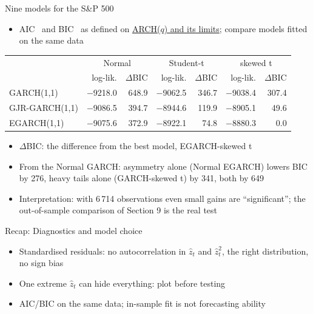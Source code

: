 \begin{frame}{Nine models for the S\&P 500}
\itemsize{\footnotesize}
\begin{itemize}
    \item AIC \ and BIC \ as defined on \hyperlink{ch5-aicbic}{ARCH($q$) and its limits}; compare models fitted on the same data
\end{itemize}\begin{center}
\scriptsize
\begin{tabular}{lrrrrrr}
\toprule
& \multicolumn{2}{c}{Normal} & \multicolumn{2}{c}{Student-t} & \multicolumn{2}{c}{skewed t} \\ & log-lik. & $\Delta$BIC & log-lik. & $\Delta$BIC & log-lik. & $\Delta$BIC \\
\midrule
GARCH(1,1) & \ensuremath{-}9218.0 & 648.9 & \ensuremath{-}9062.5 & 346.7 & \ensuremath{-}9038.4 & 307.4 \\
GJR-GARCH(1,1) & \ensuremath{-}9086.5 & 394.7 & \ensuremath{-}8944.6 & 119.9 & \ensuremath{-}8905.1 & 49.6 \\
EGARCH(1,1) & \ensuremath{-}9075.6 & 372.9 & \ensuremath{-}8922.1 & 74.8 & \ensuremath{-}8880.3 & 0.0 \\
\bottomrule
\end{tabular}
\end{center}
\begin{itemize}
    \item $\Delta$BIC: the difference from the best model, EGARCH-skewed t
    \item From the Normal GARCH: asymmetry alone (Normal EGARCH) lowers BIC by 276, heavy tails alone (GARCH-skewed t) by 341, both by 649
    \item Interpretation: with 6\,714 observations even small gains are ``significant''; the out-of-sample comparison of Section 9 is the real test
\end{itemize}
\end{frame}

\begin{frame}{Recap: Diagnostics and model choice}
\itemsize{\small}
\begin{itemize}
    \item Standardised residuals: no autocorrelation in $\hat z_t$ and $\hat z_t^2$, the right distribution, no sign bias
    \item One extreme $\hat z_t$ can hide everything: plot before testing
    \item AIC/BIC on the same data; in-sample fit is not forecasting ability
\end{itemize}
\end{frame}


